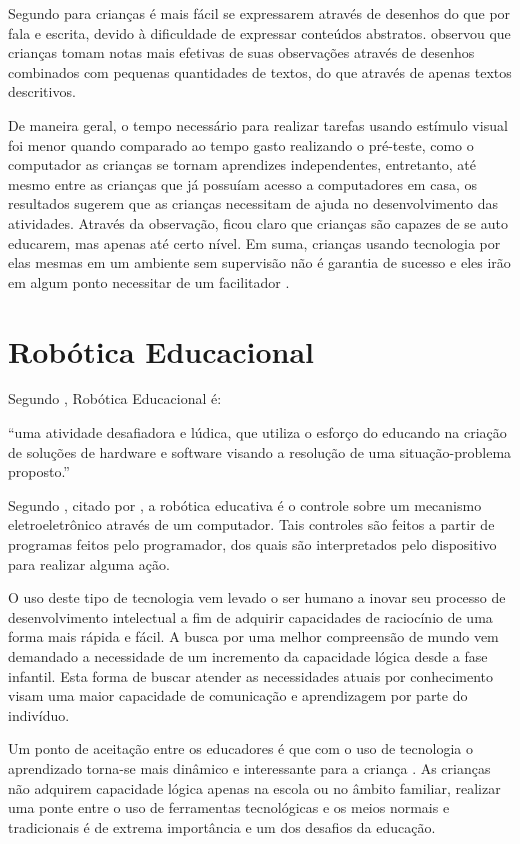 Segundo  para crianças é mais fácil se expressarem através de desenhos do que por fala e escrita, devido à dificuldade
de expressar conteúdos abstratos.  observou que crianças tomam notas mais efetivas de suas observações através de
desenhos combinados com pequenas quantidades de textos, do que através de apenas textos descritivos.

De maneira geral, o tempo necessário para realizar tarefas usando estímulo visual foi menor quando comparado ao tempo gasto
realizando o pré-teste, como o computador as crianças se tornam aprendizes independentes, entretanto, até mesmo entre as crianças
que já possuíam acesso a computadores em casa, os resultados sugerem que as crianças necessitam de ajuda no desenvolvimento das
atividades. Através da observação, ficou claro que crianças são capazes de se auto educarem, mas apenas até certo nível. Em suma,
crianças usando tecnologia por elas mesmas em um ambiente sem supervisão não é garantia de sucesso e eles irão em algum ponto
necessitar de um facilitador \cite{husnoo:2013}.

\section{Robótica Educacional}

Segundo , Robótica Educacional é:

“uma atividade desafiadora e lúdica, que utiliza o esforço do educando na criação de soluções de hardware e software visando a
resolução de uma situação-problema proposto.”

Segundo , citado por , a robótica educativa é o controle sobre um mecanismo
eletroeletrônico através de um computador. Tais controles são feitos a partir de programas feitos pelo programador, dos quais
são interpretados pelo dispositivo para realizar alguma ação.

O uso deste tipo de tecnologia vem levado o ser humano a inovar seu processo de desenvolvimento intelectual a fim de adquirir
capacidades de raciocínio de uma forma mais rápida e fácil. A busca por uma melhor compreensão de mundo vem demandado a necessidade
de um incremento da capacidade lógica desde a fase infantil. Esta forma de buscar atender as necessidades atuais por conhecimento
visam uma maior capacidade de comunicação e aprendizagem por parte do indivíduo.

Um ponto de aceitação entre os educadores é que com o uso de tecnologia o aprendizado torna-se mais dinâmico e interessante para
a criança \cite{zilli:2004}. As crianças não adquirem capacidade lógica apenas na escola ou no âmbito familiar, realizar uma ponte
entre o uso de ferramentas tecnológicas e os meios normais e tradicionais é de extrema importância e um dos desafios da educação.

